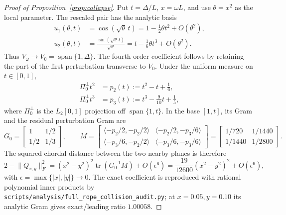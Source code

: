 \begin{proof}[Proof of Proposition~\ref{prop:collapse}]
Put $t=\Delta/L$, $x=\omega L$, and use $\theta=x^2$ as the local parameter.
The rescaled pair has the analytic basis
\begin{align}
u_1(\theta,t)&=\cos(\sqrt\theta\,t)
 =1-\tfrac12\theta t^2+O(\theta^2),\\
u_2(\theta,t)&=\frac{\sin(\sqrt\theta\,t)}{\sqrt\theta}
 =t-\tfrac16\theta t^3+O(\theta^2).
\label{eq:slow-basis-expansion}
\end{align}
Thus $V_\omega\to V_0=\operatorname{span}\{1,\Delta\}$.  The fourth-order
coefficient follows by retaining the part of the first perturbation transverse
to $V_0$. Under the
uniform measure on $t\in[0,1]$,
\begin{align}
\Pi_0^\perp t^2&=p_2(t):=t^2-t+\tfrac16,\\
\Pi_0^\perp t^3&=p_3(t):=t^3-\tfrac9{10}t+\tfrac15,
\label{eq:slow-residual-polynomials}
\end{align}
where $\Pi_0^\perp$ is the $L_2[0,1]$ projection off
$\operatorname{span}\{1,t\}$.  In the base $[1,t]$, its Gram and the residual
perturbation Gram are
\begin{equation}
G_0=
\begin{bmatrix}1&1/2\\[1pt]1/2&1/3\end{bmatrix},\qquad
M=
\begin{bmatrix}
\langle-p_2/2,-p_2/2\rangle&\langle-p_2/2,-p_3/6\rangle\\
\langle-p_3/6,-p_2/2\rangle&\langle-p_3/6,-p_3/6\rangle
\end{bmatrix}
=\begin{bmatrix}1/720&1/1440\\[1pt]1/1440&1/2800\end{bmatrix}.
\label{eq:slow-residual-gram}
\end{equation}
The squared chordal distance between the two nearby planes is therefore
\begin{equation}
2-\lVert Q_{x,y}\rVert_F^2
=(x^2-y^2)^2\operatorname{tr}(G_0^{-1}M)+O(\epsilon^6)
=\frac{19}{12600}(x^2-y^2)^2+O(\epsilon^6),
\label{eq:slow-collapse-expanded}
\end{equation}
with $\epsilon=\max\{|x|,|y|\}\to0$.  The exact coefficient is reproduced
with rational polynomial inner products by
\texttt{scripts/analysis/full\_rope\_collision\_audit.py}; at
$x{=}0.05,y{=}0.10$ its analytic Gram gives exact/leading ratio $1.00058$.


\end{proof}
